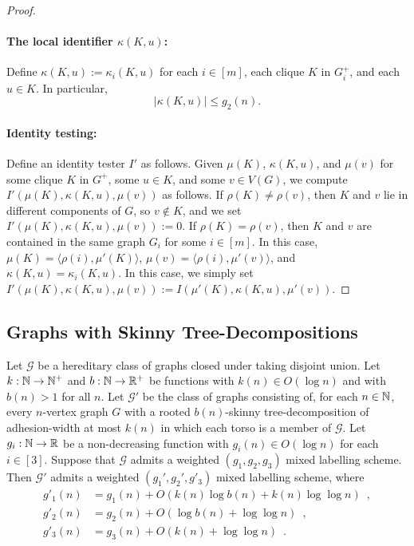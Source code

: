 \documentclass{patmorin}
\renewcommand{\leq}{\leqslant}
\newcommand{\david}[1]{\noindent{\color{orange} DW: #1}}
\newcommand{\vida}[1]{\noindent{\color{pink} VD: #1}}
\newcommand{\Oh}{O}
\newcommand{\calG}{\mathcal{G}}
\begin{document}
\begin{proof}
  \paragraph{\boldmath The local identifier $\kappa(K,u)$:}
  Define $\kappa(K,u) := \kappa_i(K,u)$ for each $i\in[m]$, each clique $K$ in $G^+_i$, and each $u\in K$. In particular,
  \[
    |\kappa(K,u)| \leq g_2(n).
  \]

  \paragraph{Identity testing:}
  Define an identity tester $I'$ as follows.
  Given $\mu(K)$, $\kappa(K,u)$, and $\mu(v)$ for some clique $K$ in $G^+$, some $u\in K$, and some $v\in V(G)$, we compute $I'(\mu(K),\kappa(K,u),\mu(v))$ as follows.
  If $\rho(K)\neq\rho(v)$, then $K$ and $v$ lie in different components of $G$, so $v\not\in K$, and we set $I'(\mu(K),\kappa(K,u),\mu(v)):=0$.  If $\rho(K)=\rho(v)$, then $K$ and $v$ are contained in the same graph $G_i$ for some $i\in[m]$. In this case, 
  $\mu(K)=\langle\rho(i),\mu'(K)\rangle$,
  $\mu(v)=\langle\rho(i),\mu'(v)\rangle$, and
  $\kappa(K,u)=\kappa_i(K,u)$.
  In this case, we simply set $I'(\mu(K),\kappa(K,u),\mu(v)) := I(\mu'(K),\kappa(K,u),\mu'(v))$.
\end{proof}

\subsection{Graphs with Skinny Tree-Decompositions}
\label{sec:skinny}

\begin{lem}\label{skinny_labelling}
  Let $\calG$ be a hereditary class of graphs closed under taking disjoint union.
  Let $k:\mathbb{N}\to\mathbb{N}^+$ and $b:\mathbb{N}\to\mathbb{R}^+$ be functions with $k(n)\in\Oh(\log n)$ and with $b(n)>1$ for all $n$.
  Let $\calG'$ be the class of graphs consisting of, for each $n\in\mathbb{N}$, every $n$-vertex graph $G$ with a rooted $b(n)$-skinny tree-decomposition of adhesion-width at most $k(n)$ in which each torso is a member of $\calG$.
  Let $g_i:\mathbb{N}\to\mathbb{R}$ be a non-decreasing function with $g_i(n)\in \Oh(\log n)$ for each $i\in[3]$.
  Suppose that $\calG$ admits a weighted $(g_1,g_2,g_3)$ mixed labelling scheme.
  Then $\calG'$ admits a weighted $(g_1',g_2',g'_3)$ mixed labelling scheme, where
  \begin{align*}
    g'_1(n)
     & = g_1(n) + \Oh(k(n)\log b(n) + k(n) \log\log n)\enspace, \\
    g'_2(n)
     & = g_2(n)+\Oh(\log b(n)+\log\log n)\enspace,              \\
    g'_3(n)
     & = g_3(n) + \Oh(k(n) + \log\log n)\enspace.
  \end{align*}
\end{lem}
\end{document}
